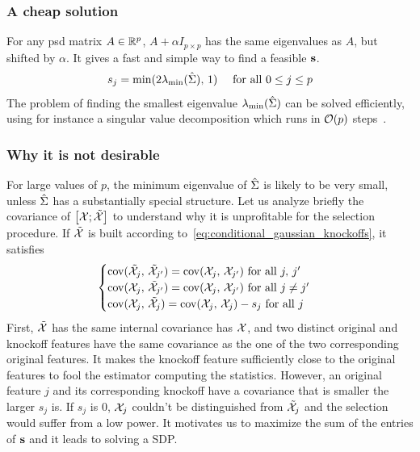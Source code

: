 \subsubsection{A cheap solution}

For any psd matrix $A \in \mathbb{R}^p$, $A + \alpha I_{p \times p}$ has the same eigenvalues as $A$, but shifted by $\alpha$.
It gives a fast and simple way to find a feasible $\mathbf{s}$.
\begin{equation}\label{eq:equi}
    s_j = \min(2\lambda_{\min}(\hat{\Sigma}),\, 1)
    \quad\text{ for all } 0 \leq j \leq p
\end{equation}
The problem of finding the smallest eigenvalue $\lambda_{\min}(\hat{\Sigma})$ can be solved efficiently,
using for instance a singular value decomposition which runs in $\mathcal{O}(p)$ steps~\cite{svd}.

\subsubsection{Why it is not desirable}

For large values of $p$,
the minimum eigenvalue of $\hat{\Sigma}$ is likely to be very small,
unless $\hat{\Sigma}$ has a substantially special structure.
Let us analyze briefly the covariance of $\big[ \mathcal{X}; \tilde{\mathcal{X}} \big]$
to understand why it is unprofitable for the selection procedure.
If $\tilde{\mathcal{X}}$ is built according to~\ref{eq:conditional_gaussian_knockoffs}, it satisfies
\begin{equation*}
    \begin{cases}
        \operatorname*{cov}(\tilde{\mathcal{X}}_j,\, \tilde{\mathcal{X}}_{j'}) = \operatorname*{cov}(\mathcal{X}_j,\, \mathcal{X}_{j'}) \text{ for all } j,\,j'\\
        \operatorname*{cov}(\mathcal{X}_j,\, \tilde{\mathcal{X}}_{j'}) = \operatorname*{cov}(\mathcal{X}_j,\, \mathcal{X}_{j'}) \text{ for all } j \neq j'\\
        \operatorname*{cov}(\mathcal{X}_j,\, \tilde{\mathcal{X}}_j) = \operatorname*{cov}(\mathcal{X}_j,\, \mathcal{X}_j) - s_j \text{ for all } j
    \end{cases}
\end{equation*}
First, $\tilde{\mathcal{X}}$ has the same internal covariance has $\mathcal{X}$,
and two distinct original and knockoff features have the same covariance
as the one of the two corresponding original features.
It makes the knockoff feature sufficiently close to the original features
to fool the estimator computing the statistics.
However, an original feature $j$ and its corresponding knockoff have a covariance that is smaller the larger $s_j$ is.
If $s_j$ is $0$, $\mathcal{X}_j$ couldn't be distinguished from $\tilde{\mathcal{X}}_j$ and the selection would suffer from a low power.
It motivates us to maximize the sum of the entries of $\mathbf{s}$ and it leads to solving a SDP\@.

